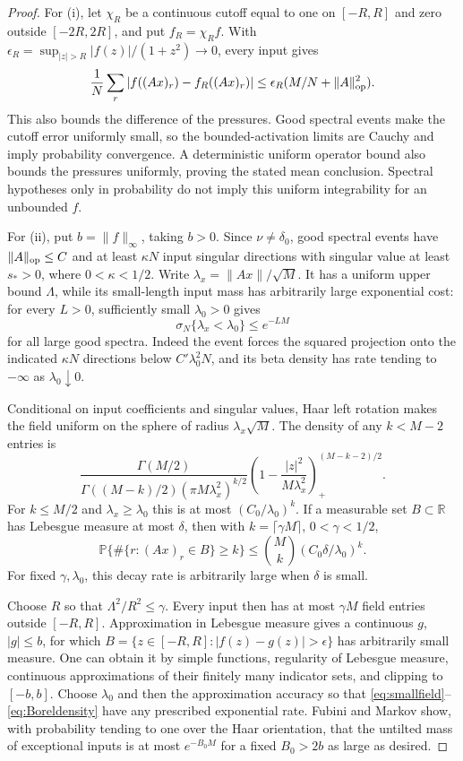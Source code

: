 \documentclass[11pt]{article}
\numberwithin{equation}{section}
\theoremstyle{definition}
\newcommand{\Pbb}{\mathbb P}
\newcommand{\R}{\mathbb R}
\newcommand{\norm}[1]{\lVert #1\rVert}
\begin{document}
\begin{proof}
For (i), let $\chi_R$ be a continuous cutoff equal to one on $[-R,R]$ and zero outside $[-2R,2R]$, and put $f_R=\chi_Rf$. With $\epsilon_R=\sup_{|z|>R}|f(z)|/(1+z^2)\to0$, every input gives
\[
\frac1N\sum_r|f((Ax)_r)-f_R((Ax)_r)|
\le\epsilon_R(M/N+\norm A_{\rm op}^2).
\]
This also bounds the difference of the pressures. Good spectral events make the cutoff error uniformly small, so the bounded-activation limits are Cauchy and imply probability convergence. A deterministic uniform operator bound also bounds the pressures uniformly, proving the stated mean conclusion. Spectral hypotheses only in probability do not imply this uniform integrability for an unbounded $f$.

For (ii), put $b=\norm f_\infty$, taking $b>0$. Since $\nu\ne\delta_0$, good spectral events have $\norm A_{\rm op}\le C$ and at least $\kappa N$ input singular directions with singular value at least $s_*>0$, where $0<\kappa<1/2$. Write $\lambda_x=\norm{Ax}/\sqrt M$. It has a uniform upper bound $\Lambda$, while its small-length input mass has arbitrarily large exponential cost: for every $L>0$, sufficiently small $\lambda_0>0$ gives
\begin{equation}\label{eq:smallfield}
\sigma_N\{\lambda_x<\lambda_0\}\le e^{-LM}
\end{equation}
for all large good spectra. Indeed the event forces the squared projection onto the indicated $\kappa N$ directions below $C'\lambda_0^2N$, and its beta density has rate tending to $-\infty$ as $\lambda_0\downarrow0$.

Conditional on input coefficients and singular values, Haar left rotation makes the field uniform on the sphere of radius $\lambda_x\sqrt M$. The density of any $k<M-2$ entries is
\[
\frac{\Gamma(M/2)}{\Gamma((M-k)/2)(\pi M\lambda_x^2)^{k/2}}
\left(1-\frac{|z|^2}{M\lambda_x^2}\right)_+^{(M-k-2)/2}.
\]
For $k\le M/2$ and $\lambda_x\ge\lambda_0$ this is at most $(C_0/\lambda_0)^k$. If a measurable set $B\subset\R$ has Lebesgue measure at most $\delta$, then with $k=\lceil\gamma M\rceil$, $0<\gamma<1/2$,
\begin{equation}\label{eq:Boreldensity}
\Pbb\{\#\{r:(Ax)_r\in B\}\ge k\}
\le\binom{M}{k}(C_0\delta/\lambda_0)^k.
\end{equation}
For fixed $\gamma,\lambda_0$, this decay rate is arbitrarily large when $\delta$ is small.

Choose $R$ so that $\Lambda^2/R^2\le\gamma$. Every input then has at most $\gamma M$ field entries outside $[-R,R]$. Approximation in Lebesgue measure gives a continuous $g$, $|g|\le b$, for which $B=\{z\in[-R,R]:|f(z)-g(z)|>\epsilon\}$ has arbitrarily small measure. One can obtain it by simple functions, regularity of Lebesgue measure, continuous approximations of their finitely many indicator sets, and clipping to $[-b,b]$. Choose $\lambda_0$ and then the approximation accuracy so that \eqref{eq:smallfield}--\eqref{eq:Boreldensity} have any prescribed exponential rate. Fubini and Markov show, with probability tending to one over the Haar orientation, that the untilted mass of exceptional inputs is at most $e^{-B_0M}$ for a fixed $B_0>2b$ as large as desired.


\end{proof}
\end{document}
